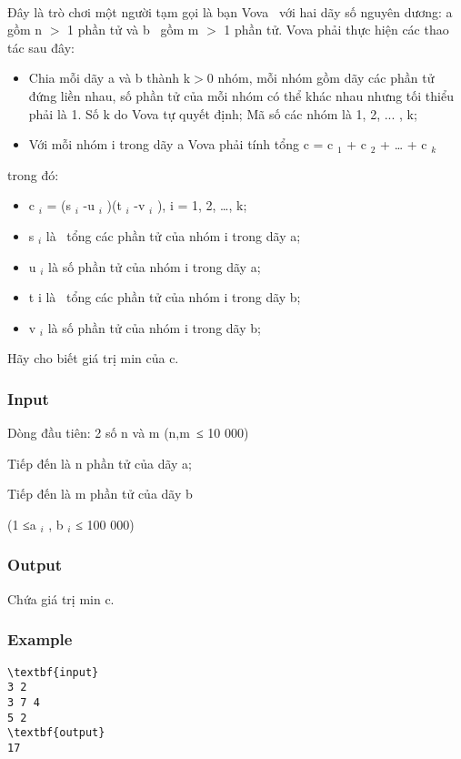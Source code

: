 

 

Đây là trò chơi một người tạm gọi là bạn Vova  với hai dãy số nguyên dương: a gồm n $>$ 1 phần tử và b  gồm m $>$ 1 phần tử. Vova phải thực hiện các thao tác sau đây:
\begin{itemize}
	\item Chia mỗi dãy a và b thành k$>$0 nhóm, mỗi nhóm gồm dãy các phần tử đứng liền nhau, số phần tử của mỗi nhóm có thể khác nhau nhưng tối thiểu phải là 1. Số k do Vova tự quyết định; Mã số các nhóm là 1, 2, ... , k;
	\item Với mỗi nhóm i trong dãy a Vova phải tính tổng c = c $_ 1 $ + c $_ 2 $ + … + c $_ k $
\end{itemize}

trong đó:
\begin{itemize}
	\item c $_ i $ = (s $_ i $ -u $_ i $ )(t $_ i $ -v $_ i $ ), i = 1, 2, …, k;
	\item s $_ i $ là  tổng các phần tử của nhóm i trong dãy a;
	\item u $_ i $ là số phần tử của nhóm i trong dãy a;
	\item t i là  tổng các phần tử của nhóm i trong dãy b;
	\item v $_ i $ là số phần tử của nhóm i trong dãy b;
\end{itemize}

Hãy cho biết giá trị min của c.

\subsubsection{Input}

Dòng đầu tiên: 2 số n và m (n,m ≤ 10 000)

Tiếp đến là n phần tử của dãy a;

Tiếp đến là m phần tử của dãy b

(1 ≤a $_ i $ , b $_ i $ ≤ 100 000)

\subsubsection{Output}

Chứa giá trị min c.

\subsubsection{Example}
\begin{verbatim}
\textbf{input}
3 2
3 7 4
5 2
\textbf{output}
17\end{verbatim}